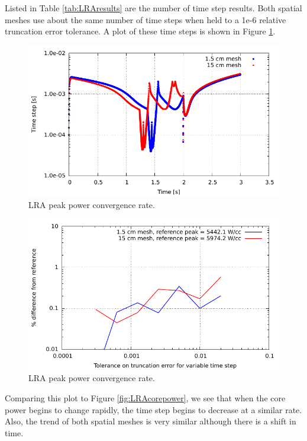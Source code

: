 \documentclass{ansconf}
\numberwithin{equation}{section}
\begin{document}
Listed in Table \ref{tab:LRAresults} are the number of time step results. Both spatial meshes use about the same number of time steps when held to a 1e-6 relative truncation error tolerance. A plot of these time steps is shown in Figure \ref{fig:LRAtime}.
\begin{figure}
\centering \includegraphics[scale=1.00]{./figs/LRAtimesteps.pdf}
\caption{LRA peak power convergence rate.}
\label{fig:LRAtime}
\end{figure}
\begin{figure}
\centering \includegraphics[scale=1.00]{./figs/LRA_order.pdf}
\caption{LRA peak power convergence rate.}
\label{fig:LRAorder}
\end{figure}
Comparing this plot to Figure \ref{fig:LRAcorepower}, we see that when the core power begins to change rapidly, the time step begins to decrease at a similar rate. Also, the trend of both spatial meshes is very similar although there is a shift in time. 
\end{document}
